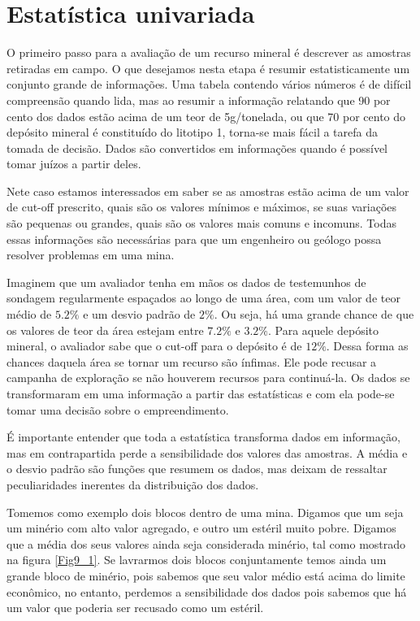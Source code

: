 \chapter{Estatística univariada}

O primeiro passo para a avaliação de um recurso mineral é descrever as amostras retiradas em campo. O que desejamos nesta etapa é resumir estatisticamente um conjunto grande de informações. Uma tabela contendo vários números é de difícil compreensão quando lida, mas ao resumir a informação relatando que 90 por cento dos dados estão acima de um teor de 5g/tonelada, ou que 70 por cento do depósito mineral é constituído do litotipo 1, torna-se mais fácil a tarefa da tomada de decisão. Dados são convertidos em informações quando é possível tomar juízos a partir deles. 

Nete caso estamos interessados em saber se as amostras estão acima de um valor de cut-off prescrito, quais são os valores mínimos e máximos, se suas variações são pequenas ou grandes, quais são os valores mais comuns e incomuns. Todas essas informações são necessárias para que um engenheiro ou geólogo possa resolver problemas em uma mina. 

Imaginem que um avaliador tenha em mãos os dados de testemunhos de sondagem regularmente espaçados ao longo de uma área, com um valor de teor médio de $5.2\%$ e um desvio padrão de $2\%$. Ou seja, há uma grande chance de que os valores de teor da área estejam entre $7.2\%$ e $3.2\%$. Para aquele depósito mineral, o avaliador sabe que o cut-off para o depósito é de $12\%$. Dessa forma as chances daquela área se tornar um recurso são ínfimas. Ele pode recusar a campanha de exploração se não houverem recursos para continuá-la. Os dados se transformaram em uma informação a partir das estatísticas e com ela pode-se tomar uma decisão sobre o empreendimento.  

É importante entender que toda a estatística transforma dados em informação, mas em contrapartida perde a sensibilidade dos valores das amostras. A média e o desvio padrão são funções que resumem os dados, mas deixam de ressaltar peculiaridades inerentes da distribuição dos dados.

Tomemos como exemplo dois blocos dentro de uma mina. Digamos que um seja um minério com alto valor agregado, e outro um estéril muito pobre. Digamos que a média dos seus valores ainda seja considerada minério, tal como mostrado na figura \ref{Fig9_1}. Se lavrarmos dois blocos conjuntamente temos ainda um grande bloco de minério, pois sabemos que seu valor médio está acima do limite econômico, no entanto, perdemos a sensibilidade dos dados pois sabemos que há um valor que poderia ser recusado como um estéril.

